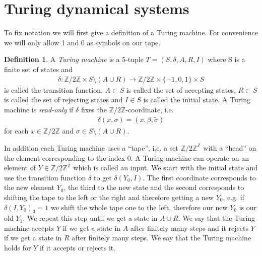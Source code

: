 \documentclass[12pt,a4paper]{scrartcl}
\theoremstyle{plain}
\theoremstyle{definition}
\newtheorem{Definition}[Theorem]{Definition}
\numberwithin{equation}{section}
\newcommand{\Z}{\mathbb{Z}} %
\newcommand{\2}{\mathbb{Z} / 2 \mathbb{Z}}
\newcommand{\1}{\bar{1}}
\newcommand{\0}{\bar{0}}
\begin{document}
\section{Turing dynamical systems}
To fix notation we will first give a definition of a Turing machine. For convenience we will only allow 1 and 0 as symbols on our tape.
\begin{Definition}
	A \emph{Turing machine} is a 5-tuple $T=(S,\delta, A, R, I)$ where S is a finite set of states and 
	\begin{align*}
		\delta\colon\2 \times S \setminus(A \cup R) \to \2 \times \{-1, 0, 1\} \times S
	\end{align*}
	is called the transition function. $A \subset S$ is called the set of accepting states, $R \subset S$ is called the set of rejecting states and $I \in S$ is called the initial state.
	A Turing machine is \emph{read-only} if $\delta$ fixes the $\2$-coordinate, i.e.
	\begin{align*}
		\delta (x, \sigma) = (x, \beta, \tilde{\sigma})
	\end{align*}
	for each $x \in \2$ and $\sigma \in S \setminus(A \cup R)$.
\end{Definition}
In addition each Turing machine uses a ``tape'', i.e. a set $\Z / 2\Z ^{\Z}$ with a ``head'' on the element corresponding to the index 0. A Turing machine can operate on an element of $Y \in \Z / 2\Z ^{\Z}$ which is called an input. We start with the initial state and use the transition function $\delta$ to get $\delta(Y_0, I)$. The first coordinate corresponds to the new element $Y_0$, the third to the new state and the second corresponds to shifting the tape to the left or the right and therefore getting a new $Y_0$, e.g. if $\delta(I, Y_0)_3 = 1$ we shift the whole tape one to the left, therefore our new $Y_0$ is our old $Y_1$. We repeat this step until we get a state in $A \cup R$. We say that the Turing machine accepts $Y$ if we get a state in $A$ after finitely many steps and it rejects $Y$ if we get a state in $R$ after finitely many steps. We say that the Turing machine holds for $Y$ if it accepts or rejects it.
\end{document}
